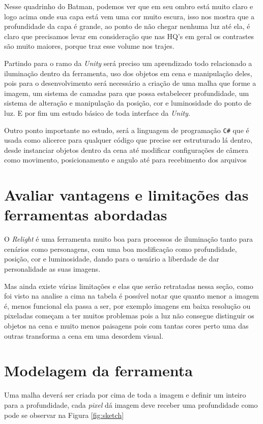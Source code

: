 Nesse quadrinho do Batman, podemos ver que em seu ombro está muito claro e logo acima onde sua capa está vem uma cor muito escura, isso nos mostra que a profundidade da capa é grande, ao ponto de não chegar nenhuma luz até ela, é claro que precisamos levar em consideração que nas HQ’s em geral os contrastes são muito maiores, porque traz esse volume nos trajes.

Partindo para o ramo da \textit{Unity} será preciso um aprendizado todo relacionado a iluminação dentro da ferramenta, uso dos objetos em cena e manipulação deles, pois para o desenvolvimento será necessário a criação de uma malha que forme a imagem, um sistema de camadas para que possa estabelecer profundidade, um sistema de alteração e manipulação da posição, cor e luminosidade do ponto de luz. E por fim um estudo básico de toda interface da \textit{Unity}.

Outro ponto importante no estudo, será a linguagem de programação \texttt{C\#} que é usada como alicerce para qualquer código que precise ser estruturado lá dentro, desde instanciar objetos dentro da cena até modificar configurações de câmera como movimento, posicionamento e angulo até para recebimento dos arquivos

\section{Avaliar vantagens e limitações das ferramentas abordadas}

O \textit{Relight} é uma ferramenta muito boa para processos de iluminação tanto para cenários como personagens, com uma boa modificação como profundidade, posição, cor e luminosidade, dando para o usuário a liberdade de dar personalidade as suas imagens.

Mas ainda existe várias limitações e elas que serão retratadas nessa seção, como foi visto na analise a cima na tabela é possível notar que quanto menor a imagem é, menos funcional ela passa a ser, por exemplo imagens em baixa resolução ou pixeladas começam a ter muitos problemas pois a luz não consegue distinguir os objetos na cena e muito menos paisagens pois com tantas cores perto uma das outras transforma a cena em uma desordem visual.

\section{Modelagem da ferramenta}

Uma malha deverá ser criada por cima de toda a imagem e definir um inteiro para a profundidade, cada \textit{pixel} dá imagem deve receber uma profundidade como pode se observar na Figura \ref{fig:sketch}

